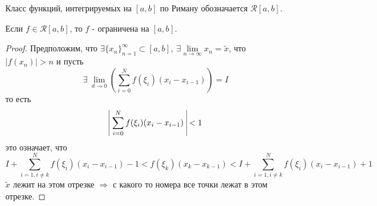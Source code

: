\begin{definition}
    Класс функций, интегрируемых на $[a,b]$ по Риману обозначается $\mathcal{R}[a,b]$.
\end{definition} 
\begin{theorem}
    Если $f\in \mathcal{R}[a,b]$, то $f$ - ограничена на $[a,b]$.
\end{theorem} 
\begin{proof}
    Предположим, что $\exists \{x_n\}_{n=1}^{\infty}\subset [a,b],\ \exists \lim\limits_{n\to \infty}x_n=\widetilde{x}$, что\\
    $|f(x_n)|>n$ и пусть
    \[\exists\ \lim\limits_{d\to 0}\left( \sum\limits_{i=0}^{N}f(\xi_i)(x_i-x_{i-1}) \right)=I\] 
    то есть 
    \[\vline\ \sum\limits_{i=0}^{N}f(\xi_i)(x_i-x_{i-1})\ \vline<1\]
    это означает, что 
    \[I+\sum\limits_{i=1,i\ne k}^{N} f(\xi_i)(x_i-x_{i-1})-1<f(\xi_k)(x_k-x_{k-1})<I+\sum\limits_{i=1,i\ne k}^{N} f(\xi_i)(x_i-x_{i-1})+1\]
    $\widetilde{x}$ лежит на этом отрезке $\Rightarrow$ с какого то номера все точки лежат в этом отрезке.
\end{proof} 

